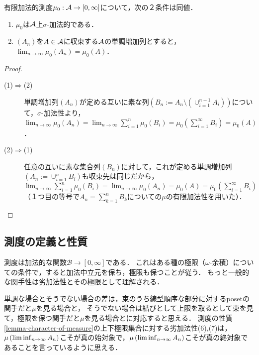 \documentclass[uplatex, dvipdfmx]{jsreport}
\renewcommand{\B}{\mathcal{B}}
\begin{document}
\begin{lemma}\label{lemma-sigma-additivity-of-finitely-additive-measure-in-terms-of-monotone-sequence}
    有限加法的測度$\mu_0:\mathcal{A}\to[0,\infty]$について，次の２条件は同値．
    \begin{enumerate}
        \item $\mu_0$は$\mathcal{A}$上$\sigma$-加法的である．
        \item $(A_n)$を$A\in\mathcal{A}$に収束する$\mathcal{A}$の単調増加列とすると，$\lim_{n\to\infty}\mu_0(A_n)=\mu_0(A)$．
    \end{enumerate}
\end{lemma}
\begin{proof}\mbox{}
    \begin{description}
        \item[(1)$\Rightarrow$(2)] 単調増加列$(A_n)$が定める互いに素な列$(B_n:=A_n\setminus(\cup_{i=1}^{n-1}A_i))$について，$\sigma$-加法性より，$\lim_{n\to\infty}\mu_0(A_n)=\lim_{n\to\infty}\sum^n_{i=1}\mu_0(B_i)=\mu_0(\sum^\infty_{i=1}B_i)=\mu_0(A)$．
        \item[(2)$\Rightarrow$(1)] 任意の互いに素な集合列$(B_n)$に対して，これが定める単調増加列$(A_n:=\cup_{i=1}^nB_i)$も収束先は同じだから，$\lim_{n\to\infty}\sum^n_{i=1}\mu_0(B_i)=\lim_{n\to\infty}\mu_0(A_n)=\mu_0(A)=\mu_0(\sum^\infty_{i=1}B_i)$（１つ目の等号で$A_n=\sum_{k=1}^nB_k$についての$\mu$の有限加法性を用いた）．
    \end{description}
\end{proof}

\subsection{測度の定義と性質}

\begin{tcolorbox}[colframe=ForestGreen, colback=ForestGreen!10!white,breakable,colbacktitle=ForestGreen!40!white,coltitle=black,fonttitle=\bfseries\sffamily,
title=]
    測度は加法的な関数$\B\to[0,\infty]$である．
    これはある種の極限（$\omega$-余積）についての条件で，すると加法中立元を保ち，極限も保つことが従う．
    もっと一般的な関手性は劣加法性とその極限として理解される．

    単調な場合とそうでない場合の差は，束のうち線型順序な部分に対するposetの関手だと$\mu$を見る場合と，
    そうでない場合は結びとして上限を取るとして束を見て，極限を保つ関手だと$\mu$を見る場合とに対応すると思える．
    測度の性質\ref{lemma-character-of-measure}の上下極限集合に対する劣加法性(6),(7)は，$\mu\left(\liminf_{n\to\infty}A_n\right)$こそが真の始対象で，$\mu\left(\liminf_{n\to\infty}A_n\right)$こそが真の終対象であることを言っているように思える．
\end{tcolorbox}
\end{document}
